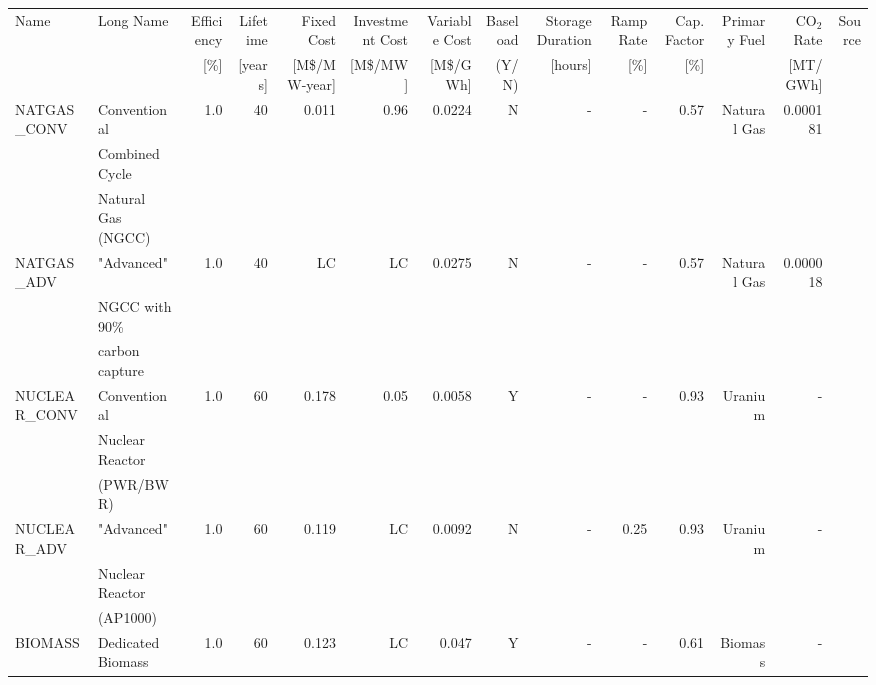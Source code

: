\begin{tabular}{llrrrrrrrrrrrr}
\toprule
        Name &                                          Long Name &  Efficiency &  Lifetime & Fixed Cost & Investment Cost& Variable Cost & Baseload & Storage Duration & Ramp Rate & Cap. Factor & Primary Fuel &  CO$_2$ Rate & Source \\
        &  & [\%]  & [years] & [M\$/MW-year] & [M\$/MW] & [M\$/GWh] &(Y/N) & [hours] & [\%] & [\%] & & [MT/GWh] &  \\
\midrule
 NATGAS\_CONV &     Conventional   &         1.0 &        40 &                   0.011 &                    0.96 &                 0.0224 &               N &                      - &       - &                0.57 &  Natural Gas &                     0.000181 &   \cite{sargent__lundy_capital_2020}     \\
 &Combined Cycle&&&&&&&&&&&&\\
 &Natural Gas (NGCC)&&&&&&&&&&&&\\
  NATGAS\_ADV &            "Advanced"   &         1.0 &        40 &                      LC &                      LC &                 0.0275 &               N &                      - &       - &                0.57 &  Natural Gas &                     0.000018 &    \cite{nrel_2020_2020}    \\
  &NGCC with 90\%&&&&&&&&&&&&\\
  &carbon capture&&&&&&&&&&&&\\
NUCLEAR\_CONV &             Conventional   &         1.0 &        60 &                   0.178 &                    0.05 &                 0.0058 &               Y &                      - &       - &                0.93 &      Uranium &                     - &  \cite{desai_nuclear_2020,nei_status_2010}      \\
&Nuclear Reactor&&&&&&&&&&&&\\
&(PWR/BWR)&&&&&&&&&&&&\\
 NUCLEAR\_ADV &                "Advanced"   &         1.0 &        60 &                      0.119 &                      LC &                 0.0092 &               N &                      - &      0.25 &                0.93 &      Uranium &                     - &   \cite{nrel_2020_2020}     \\
 &Nuclear Reactor&&&&&&&&&&&&\\
 &(AP1000)&&&&&&&&&&&&\\
     BIOMASS &                            Dedicated Biomass  &         1.0 &        60 &                      0.123 &                      LC &                  0.047 &               Y &                      - &       - &                0.61 &      Biomass &                     - &       \cite{nrel_2020_2020} \\

\end{tabular}
